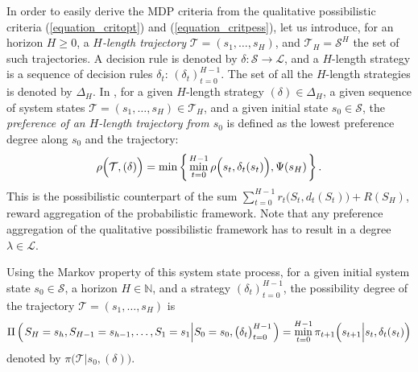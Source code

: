 In order to easily derive the MDP criteria 
from the qualitative possibilistic criteria (\ref{equation_critopt}) and (\ref{equation_critpess}), 
let us introduce, for an horizon $H\geqslant0$, 
a \textit{$H$-length trajectory} $\mathcal{T} = (s_1,\ldots,s_{H})$,
and $\mathcal{T}_H = \mathcal{S}^{H}$ the set of such trajectories.
A decision rule is denoted by $\delta: \mathcal{S} \rightarrow \mathcal{L}$, 
and a $H$-length strategy is a sequence of decision rules $\delta_t$: $(\delta_t)_{t=0}^{H-1}$.
The set of all the $H$-length strategies is denoted by $\Delta_H$.
In \cite{Sa1998.16}, for a given $H$-length strategy $(\delta) \in \Delta_H$,
a given sequence of system states $\mathcal{T} = (s_1,\ldots,s_H) \in \mathcal{T}_H$, 
and a given initial state $s_0 \in \mathcal{S}$,
the \textit{preference of an $H$-length trajectory from $s_0$} 
is defined as the lowest preference degree along $s_0$ and the trajectory:
\[ \rho \Big( \mathcal{T}, (\delta) \Big) = \min \left\{ \left.  \min_{t=0}^{H-1} \rho\Big(s_t,\delta_t(s_t)\Big), \Psi(s_H) \right. \right\}.\]
This is the possibilistic counterpart of the sum $\sum_{t=0}^{H-1} r_t \Big( S_t,d_t(S_t) \Big) + R(S_H)$,
reward aggregation of the probabilistic framework. Note that any preference aggregation of the qualitative possibilistic framework
has to result in a degree $\lambda \in \mathcal{L}$.

Using the Markov property of this system state process,
for a given initial system state $s_0 \in \mathcal{S}$, 
a horizon $H \in \mathbb{N}$,
and a strategy $(\delta_t)_{t=0}^{H-1}$, 
the possibility degree of the trajectory $\mathcal{T} = (s_1, \ldots, s_H)$ is
\begin{equation}
\label{equation_possdistribtraj}
\Pi \left( \left.  S_H=s_h, S_{H-1}=s_{h-1}, \ldots, S_1 = s_1 \Big\vert S_0 = s_0, \big(\delta_t\big)_{t=0}^{H-1}  \right. \right) = \min_{t=0}^{H-1} \pi_{t+1} \Big( s_{t+1} \Big\vert s_{t}, \delta_{t}(s_{t}) \Big)
\end{equation}
denoted by $\pi \Big( \mathcal{T} \Big\vert s_0, (\delta) \Big)$.

